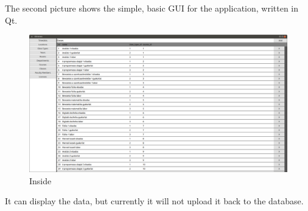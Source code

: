 The second picture shows the simple, basic GUI for the application, written in Qt.

\begin{figure}[!ht]
\centering
\includegraphics[width=\linewidth, keepaspectratio]{figures/inside.png}
\caption{Inside} 
\end{figure}

It can display the data, but currently it will not upload it back to the database.
